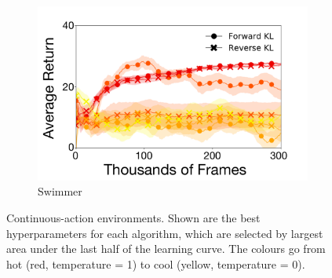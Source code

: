 \documentclass[twoside,11pt]{article}
\begin{document}
\begin{figure}[t]
\begin{subfigure}[b]{0.33\linewidth}
    \centering
    \includegraphics[width=\columnwidth]{figs/deep/continuous/Swimmer_entropy_comparison.pdf} 
    \caption{Swimmer}\label{fig:swimmer}
  \end{subfigure}
  \caption{Continuous-action environments. Shown are the best hyperparameters for each algorithm, which are selected by largest area under the last half of the learning curve. The colours go from hot (red, temperature = 1) to cool (yellow, temperature = 0). }\label{fig_cont}
\end{figure}
\end{document}
